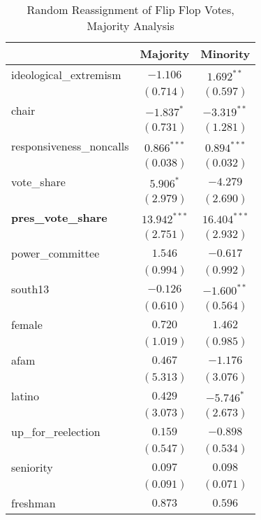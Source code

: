 \documentclass[12pt]{article}
\begin{document}
\begin{table}
	\begin{center}
	\caption{Random Reassignment of Flip Flop Votes, Majority Analysis}
		\begin{tabular}{l c c }
			\hline
			& Majority & Minority \\
			\hline
			ideological\_extremism   & $-1.106$       & $1.692^{**}$   \\
			& $(0.714)$      & $(0.597)$      \\
			chair                    & $-1.837^{*}$   & $-3.319^{**}$  \\
			& $(0.731)$      & $(1.281)$      \\
			responsiveness\_noncalls & $0.866^{***}$  & $0.894^{***}$  \\
			& $(0.038)$      & $(0.032)$      \\
			vote\_share              & $5.906^{*}$    & $-4.279$       \\
			& $(2.979)$      & $(2.690)$      \\
			\textbf{pres\_vote\_share}        & $13.942^{***}$ & $16.404^{***}$ \\
			& $(2.751)$      & $(2.932)$      \\
			power\_committee         & $1.546$        & $-0.617$       \\
			& $(0.994)$      & $(0.992)$      \\
			south13                  & $-0.126$       & $-1.600^{**}$  \\
			& $(0.610)$      & $(0.564)$      \\
			female                   & $0.720$        & $1.462$        \\
			& $(1.019)$      & $(0.985)$      \\
			afam                     & $0.467$        & $-1.176$       \\
			& $(5.313)$      & $(3.076)$      \\
			latino                   & $0.429$        & $-5.746^{*}$   \\
			& $(3.073)$      & $(2.673)$      \\
			up\_for\_reelection      & $0.159$        & $-0.898$       \\
			& $(0.547)$      & $(0.534)$      \\
			seniority                & $0.097$        & $0.098$        \\
			& $(0.091)$      & $(0.071)$      \\
			freshman                 & $0.873$        & $0.596$        \\

\end{tabular}
\end{center}
\end{table}
\end{document}
